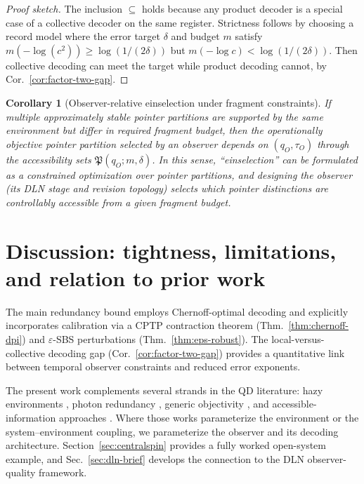 \documentclass[11pt]{article}
\newcommand{\1}{\mathbf{1}}
\theoremstyle{definition}
\theoremstyle{plain}
\newtheorem{corollary}{Corollary}
\begin{document}
\begin{proof}[Proof sketch]
The inclusion $\subseteq$ holds because any product decoder is a special case of a collective decoder on the same register.
Strictness follows by choosing a record model where the error target $\delta$ and budget $m$ satisfy
$m(-\log(c^2))\ge \log(1/(2\delta))$ but $m(-\log c)<\log(1/(2\delta))$.
Then collective decoding can meet the target while product decoding cannot, by Cor.~\ref{cor:factor-two-gap}.
\end{proof}

\begin{corollary}[Observer-relative einselection under fragment constraints]
\label{cor:observer-relative-einselection}
If multiple approximately stable pointer partitions are supported by the same environment but differ in required fragment budget, then the \emph{operationally objective} pointer partition selected by an observer depends on $(q_O,\tau_O)$ through the accessibility sets $\mathfrak{P}(q_O;m,\delta)$.
In this sense, ``einselection'' can be formulated as a constrained optimization over pointer partitions, and designing the observer (its DLN stage and revision topology) selects which pointer distinctions are controllably accessible from a given fragment budget.
\end{corollary}


\section{Discussion: tightness, limitations, and relation to prior work}

The main redundancy bound employs Chernoff-optimal decoding \citep{Audenaert2007,NussbaumSzkola2009} and explicitly incorporates calibration via a CPTP contraction theorem (Thm.~\ref{thm:chernoff-dpi}) and $\varepsilon$-SBS perturbations (Thm.~\ref{thm:eps-robust}).
The local-versus-collective decoding gap (Cor.~\ref{cor:factor-two-gap}) provides a quantitative link between temporal observer constraints and reduced error exponents.

The present work complements several strands in the QD literature: hazy environments \citep{ZwolakQuanZurek2009}, photon redundancy \citep{RiedelZurek2010,RiedelZurek2011}, generic objectivity \citep{BrandaoPianiHorodecki2015,Knott2018}, and accessible-information approaches \citep{Touil2022}.  Where those works parameterize the environment or the system--environment coupling, we parameterize the observer and its decoding architecture.  Section~\ref{sec:centralspin} provides a fully worked open-system example, and Sec.~\ref{sec:dln-brief} develops the connection to the DLN observer-quality framework.
\end{document}
